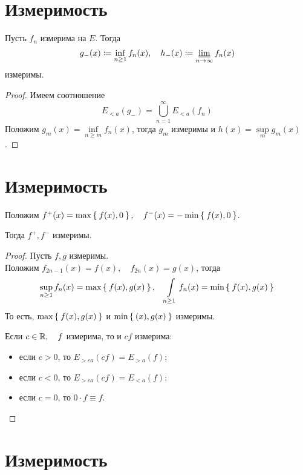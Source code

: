 \section{Измеримость }

\begin{property}
	Пусть $ f_n $ измерима на $ E $. Тогда
	$$ g_-(x) \coloneq \inf\limits_{n \ge 1} f_n(x), \quad h_-(x) \coloneq \varliminf_{n \to \infty} f_n(x) $$
	измеримы.
\end{property}

\begin{proof}
	Имеем соотношение
	$$ E_{<a}(g_-) = \bigcup_{n = 1}^\infty E_{<a}(f_n) $$
	Положим $ g_m(x) = \inf\limits_{n \ge m} f_n(x) $, тогда $ g_m $ измеримы и $ h(x) = \sup\limits_m g_m(x) $.
\end{proof}

\section{Измеримость }

\begin{property}
	Положим $ f^+(x) = \max \Set{f(x), 0}, \quad f^-(x) = -\min \Set{f(x), 0} $.

	Тогда $ f^+, f^- $ измеримы.
\end{property}

\begin{proof}
	Пусть $ f, g $ измеримы. \\
	Положим $ f_{2n - 1}(x) = f(x), \quad f_{2n}(x) = g(x) $, тогда
	$$ \sup\limits_{n \ge 1} f_n(x) = \max \Set{f(x), g(x)}, \quad \int\limits_{n \ge 1} f_n(x) = \min \Set{f(x), g(x)} $$
	То есть, $ \max\Set{f(x), g(x)} $ и $ \min \Set{(x), g(x)} $ измеримы.

	Если $ c \in \mathbb{R}, \quad f $ измерима, то и $ cf $ измерима:
	\begin{itemize}
		\item если $ c > 0 $, то $ E_{>ca}(cf) = E_{>a}(f) $;
		\item если $ c < 0 $, то $ E_{>ca}(cf) = E_{<a}(f) $;
		\item если $ c = 0 $, то $ 0 \cdot f \equiv f $.
	\end{itemize}
\end{proof}

\section{Измеримость }

